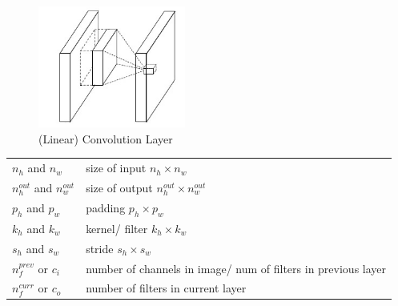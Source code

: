 \begin{table}[h]
    \begin{minipage}{0.44\linewidth}
        \begin{figure}[H]
            \centering
            \includegraphics[width=\linewidth, height=4cm, keepaspectratio]{Pictures/layers/conv-layer-linear.jpg}
            \caption{(Linear) Convolution Layer \cite{medium/towardsdatascience.com/review-nin-network-in-network-image-classification-69e271e499ee}}
        \end{figure}
    \end{minipage}
    \hfill
    \begin{minipage}{0.54\linewidth}
        \begin{customTableWrapper}{1.5}
        \begin{table}[H]
            \begin{tabular}{l p{5.5cm}}
                $n_h$ and $n_w$ & size of input $n_h \times n_w$ \\
                $n^{out}_h$ and $n^{out}_w$ & size of output $n^{out}_h \times n^{out}_w$ \\
                $p_h$ and $p_w$ & padding $p_h \times p_w$ \\
                $k_h$ and $k_w$ & kernel/ filter $k_h \times k_w$\\
                $s_h$ and $s_w$ & stride $s_h \times s_w$ \\

                \hline

                $n_f^{prev}$ or $c_i$ & number of channels in image/ num of filters in previous layer \\
                $n_f^{curr}$ or $c_o$ & number of filters in current layer \\
                
            \end{tabular}
        \end{table}
        \end{customTableWrapper}
    \end{minipage}
\end{table}

